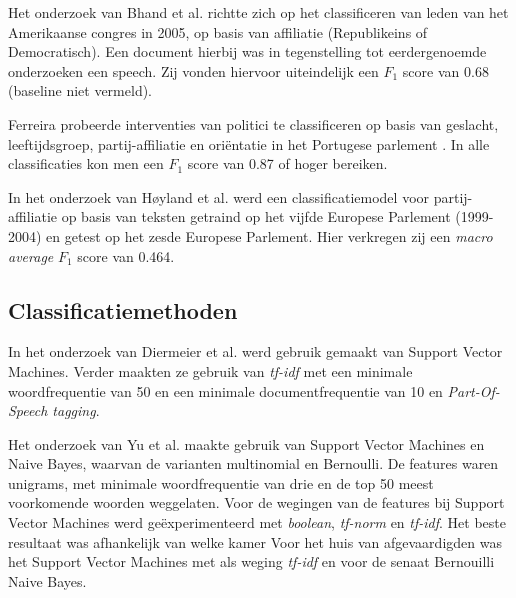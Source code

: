 Het onderzoek van Bhand et al. richtte zich op het classificeren van leden van het Amerikaanse congres in 2005, op basis van affiliatie (Republikeins of Democratisch)\cite{bhand}. Een document hierbij was in tegenstelling tot eerdergenoemde onderzoeken een speech. Zij vonden hiervoor uiteindelijk een $F_1$ score van 0.68 (baseline niet vermeld).\par

Ferreira probeerde interventies van politici te classificeren op basis van geslacht, leeftijdsgroep, partij-affiliatie en ori\"{e}ntatie in het Portugese parlement \cite{Ferreira2016UsingTT}. In alle classificaties kon men een $F_1$ score van 0.87 of hoger bereiken.\par

In het onderzoek van Høyland et al. werd een classificatiemodel voor partij-affiliatie op basis van teksten getraind op het vijfde Europese Parlement (1999-2004) en getest op het zesde Europese Parlement\cite{W14-2516}. Hier verkregen zij een \textit{macro average} $F_1$ score van 0.464.\par

\subsection{Classificatiemethoden}
\label{sec:Deelvraag1}
In het onderzoek van Diermeier et al. \cite{diermeier_godbout_yu_kaufmann_2012} werd gebruik gemaakt van Support Vector Machines. Verder maakten ze gebruik van \textit{tf-idf} met een minimale woordfrequentie van 50 en een minimale documentfrequentie van 10 en \textit{Part-Of-Speech tagging}.\par
Het onderzoek van Yu et al. \cite{doi:10.1080/19331680802149608} maakte gebruik van Support Vector Machines en Naive Bayes, waarvan de varianten multinomial en Bernoulli. De features waren unigrams, met minimale woordfrequentie van drie en de top 50 meest voorkomende woorden weggelaten. Voor de wegingen van de features bij Support Vector Machines werd geëxperimenteerd met \textit{boolean}, \textit{tf-norm} en \textit{tf-idf}. Het beste resultaat was afhankelijk van welke kamer Voor het huis van afgevaardigden was het Support Vector Machines met als weging \textit{tf-idf} en voor de senaat Bernouilli Naive Bayes.

